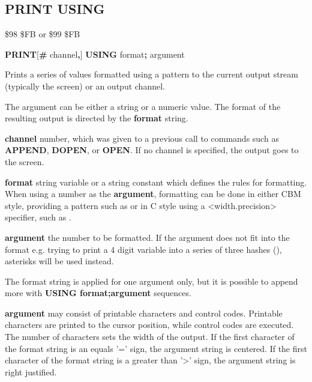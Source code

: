 \subsection{PRINT USING}
\begin{description}[leftmargin=2cm,style=nextline]
\item [Token:] \$98 \$FB or \$99 \$FB
\item [Format:] {\bf PRINT}[{\bf\#} channel{\bf,}] {\bf USING} format{\bf;} argument
\item [Usage:]  Prints a series of values formatted using a pattern to the current output
                stream (typically the screen) or an output channel.

                The argument can be either a string or a numeric value.
                The format of the resulting output is directed
                by the {\bf format} string.

                {\bf channel} number, which was given to a previous
                call to commands such as {\bf APPEND}, {\bf DOPEN}, or {\bf OPEN}.
                If no channel is specified, the output goes to the screen.

                {\bf format} string variable or a string constant
                which defines the rules for formatting.
                When using a number as the {\bf argument}, formatting can be done in either
                CBM style, providing a pattern such as 
                or in C style using a <width.precision> specifier, such as .

                {\bf argument} the number to be formatted. If the argument does not fit into the format
                e.g. trying to print a 4 digit variable into a series of three
                hashes (\screentext{\#\#\#}), asterisks will be used instead.

\item [Remarks:] The format string is applied for one argument only,
                 but it is possible to append more with
                 {\bf USING format;argument} sequences.

                {\bf argument} may consist of printable
                characters and control codes. Printable characters
                are printed to the cursor position, while control
                codes are executed.
                The number of \screentext{\#} characters sets the width of the output.
                If the first character of the format string
                is an equals '=' sign, the argument string is centered.
                If the first character of the format string
                is a greater than '>' sign, the argument string is right justified.


\end{description}
